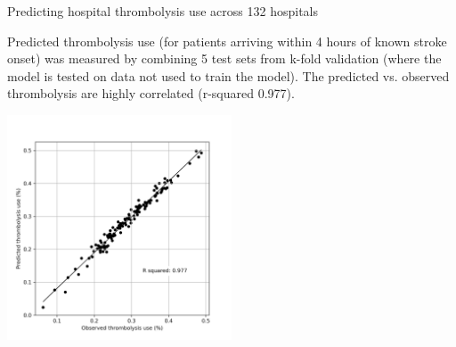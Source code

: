 \begin{frame}{Predicting hospital thrombolysis use across 132 hospitals}

\small
Predicted thrombolysis use (for patients arriving within 4 hours of known stroke onset) was measured by combining 5 test sets from k-fold validation (where the model is tested on data not used to train the model). The predicted vs. observed thrombolysis are highly correlated (r-squared 0.977). 

\begin{center}
\includegraphics[width=0.50\textwidth]{./images/02_xgb_10_features_observed_predicted_rates.jpg}
\end{center}



\end{frame}